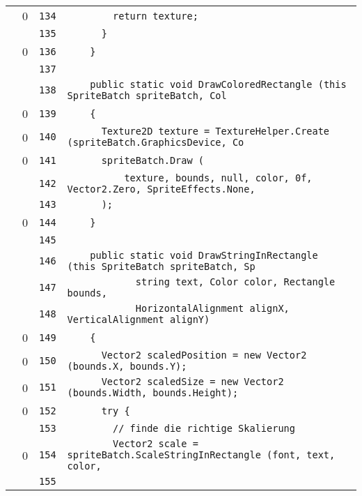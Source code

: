 \documentclass[a4paper,10pt]{article}
\begin{document}
\begin{longtable}[l]{lrrl}
\cellcolor{red} & 0 & \verb~134~ & \verb~        return texture;~\\
\cellcolor{gray} &  & \verb~135~ & \verb~      }~\\
\cellcolor{red} & 0 & \verb~136~ & \verb~    }~\\
\cellcolor{gray} &  & \verb~137~ & \verb~~\\
\cellcolor{gray} &  & \verb~138~ & \verb~    public static void DrawColoredRectangle (this SpriteBatch spriteBatch, Col~\\
\cellcolor{red} & 0 & \verb~139~ & \verb~    {~\\
\cellcolor{red} & 0 & \verb~140~ & \verb~      Texture2D texture = TextureHelper.Create (spriteBatch.GraphicsDevice, Co~\\
\cellcolor{red} & 0 & \verb~141~ & \verb~      spriteBatch.Draw (~\\
\cellcolor{gray} &  & \verb~142~ & \verb~          texture, bounds, null, color, 0f, Vector2.Zero, SpriteEffects.None, ~\\
\cellcolor{gray} &  & \verb~143~ & \verb~      );~\\
\cellcolor{red} & 0 & \verb~144~ & \verb~    }~\\
\cellcolor{gray} &  & \verb~145~ & \verb~~\\
\cellcolor{gray} &  & \verb~146~ & \verb~    public static void DrawStringInRectangle (this SpriteBatch spriteBatch, Sp~\\
\cellcolor{gray} &  & \verb~147~ & \verb~            string text, Color color, Rectangle bounds,~\\
\cellcolor{gray} &  & \verb~148~ & \verb~            HorizontalAlignment alignX, VerticalAlignment alignY)~\\
\cellcolor{red} & 0 & \verb~149~ & \verb~    {~\\
\cellcolor{red} & 0 & \verb~150~ & \verb~      Vector2 scaledPosition = new Vector2 (bounds.X, bounds.Y);~\\
\cellcolor{red} & 0 & \verb~151~ & \verb~      Vector2 scaledSize = new Vector2 (bounds.Width, bounds.Height);~\\
\cellcolor{red} & 0 & \verb~152~ & \verb~      try {~\\
\cellcolor{gray} &  & \verb~153~ & \verb~        // finde die richtige Skalierung~\\
\cellcolor{red} & 0 & \verb~154~ & \verb~        Vector2 scale = spriteBatch.ScaleStringInRectangle (font, text, color,~\\
\cellcolor{gray} &  & \verb~155~ & \verb~~\\

\end{longtable}
\end{document}
